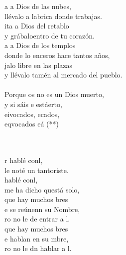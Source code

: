 \begin{cancion}%
	\begin{chorus}%
	a a Dios de las nubes,\\
	llévalo a labrica donde trabajas. \\
	ita a Dios del retablo\\
	y grábaloentro de tu corazón.\\
	a a Dios de los templos\\
	donde lo enceros hace tantos años,\\
	jalo libre en las plazas \\
	y llévalo tamén al mercado del pueblo.\\
	\jump\\
	Porque os no es un Dios muerto,\\
	y si sáis e estáerto, \\
	eivocados, ecados,\\
	eqvocados eá (**)\\
	\end{chorus}%
	\jump\\
	\jump\\
	r hablé conl,\\
	le noté un tantoriste.\\
	 hablé conl,\\
	me ha dicho questá solo,\\
	que hay muchos bres\\
	e se reúnenn su Nombre,\\
	ro no le de entrar a l.\\
	que hay muchos bres\\
	e hablan en su mbre,\\
	ro no le dn hablar a l.\\
\end{cancion}%
